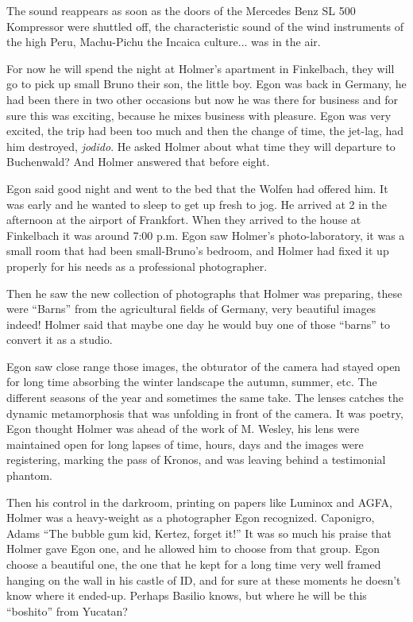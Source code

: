 \documentclass[smalldemyvopaper,11pt,twoside,onecolumn,openright,extrafontsizes]{memoir}
\begin{document}
The sound reappears as soon as the doors of the Mercedes Benz SL 500 Kompressor were shuttled off, the characteristic sound of the wind instruments of the high Peru, Machu-Pichu the Incaica culture... was in the air.

For now he will spend the night at Holmer’s apartment in Finkelbach, they will go to pick up small Bruno their son, the little boy. Egon was back in Germany, he had been there in two other occasions but now he was there for business and for sure this was exciting, because he mixes business with pleasure. Egon was very excited, the trip had been too much and then the change of time, the jet-lag, had him destroyed, \textit{jodido}. He asked Holmer about what time they will departure to Buchenwald? And Holmer answered that before eight.

Egon said good night and went to the bed that the Wolfen had offered him. It was early and he wanted to sleep to get up fresh to jog. He arrived at 2 in the afternoon at the airport of Frankfort. When they arrived to the house at Finkelbach it was around 7:00 p.m. Egon saw Holmer’s photo-laboratory, it was a small room that had been small-Bruno’s bedroom, and Holmer had fixed it up properly for his needs as a professional photographer.

Then he saw the new collection of photographs that Holmer was preparing, these were “Barns” from the agricultural fields of Germany, very beautiful images indeed! Holmer said that maybe one day he would buy one of those “barns” to convert it as a studio.

Egon saw close range those images, the obturator of the camera had stayed open for long time absorbing the winter landscape the autumn, summer, etc. The different seasons of the year and sometimes the same take. The lenses catches the dynamic metamorphosis that was unfolding in front of the camera. It was poetry, Egon thought Holmer was ahead of the work of M. Wesley, his lens were maintained open for long lapses of time, hours, days and the images were registering, marking the pass of Kronos, and was leaving behind a testimonial phantom.

Then his control in the darkroom, printing on papers like Luminox and AGFA, Holmer was a heavy-weight as a photographer Egon recognized. Caponigro, Adams “The bubble gum kid, Kertez, forget it!” It was so much his praise that Holmer gave Egon one, and he allowed him to choose from that group. Egon choose a beautiful one, the one that he kept for a long time very well framed hanging on the wall in his castle of ID, and for sure at these moments he doesn’t know where it ended-up. Perhaps Basilio knows, but where he will be this “boshito” from Yucatan?
\end{document}
